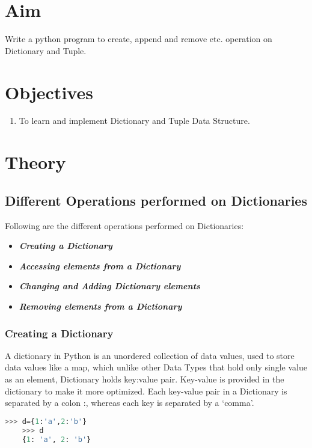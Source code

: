 \documentclass[11pt]{article}
\begin{document}
\tableofcontents
\thispagestyle{empty}
\clearpage

\setcounter{page}{1}

\section{Aim}
Write a python program to create, append and remove etc. operation on Dictionary and
Tuple.
\section{Objectives}
\begin{enumerate}
	\item To learn and implement Dictionary and Tuple Data Structure.
\end{enumerate}

\section{Theory}
\subsection{Different Operations performed on Dictionaries}
Following are the different operations performed on Dictionaries:

\begin{itemize}
	\item \textbf{\textit{Creating a Dictionary}}
	\item \textbf{\textit{Accessing elements from a Dictionary}}
	\item \textbf{\textit{Changing and Adding Dictionary elements}}
	\item \textbf{\textit{Removing elements from a Dictionary}}
\end{itemize}

\subsubsection{Creating a Dictionary}
A dictionary in Python is an unordered collection of data values, used to store data values like a map, which unlike other Data Types that hold only single value as an element, Dictionary holds key:value pair. Key-value is provided in the dictionary to make it more optimized. Each key-value pair in a Dictionary is separated by a colon :, whereas each key is separated by a ‘comma’.
\begin{lstlisting}[language=Python]
	>>> d={1:'a',2:'b'}
	>>> d
	{1: 'a', 2: 'b'}
\end{lstlisting}
\end{document}

